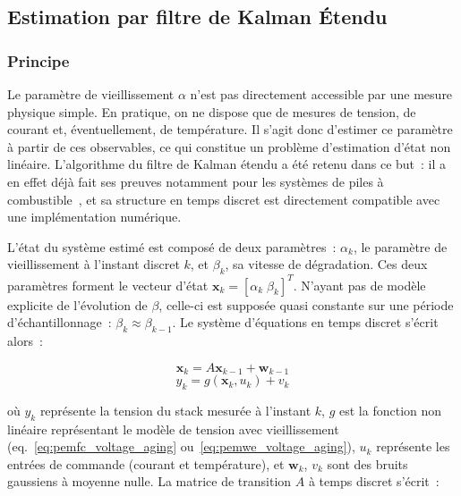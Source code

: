 \subsection{Estimation par filtre de Kalman Étendu}

\subsubsection{Principe}

Le paramètre de vieillissement $\alpha$ n'est pas directement accessible par une mesure physique simple. En pratique, on ne dispose que de mesures de tension, de courant et, éventuellement, de température. Il s'agit donc d'estimer ce paramètre à partir de ces observables, ce qui constitue un problème d'estimation d'état non linéaire. L'algorithme du filtre de Kalman étendu a été retenu dans ce but~: il a en effet déjà fait ses preuves notamment pour les systèmes de piles à combustible~\cite{bressel_extended_2016}\cite{chen_fuel_2019}, et sa structure en temps discret est directement compatible avec une implémentation numérique.

L'état du système estimé est composé de deux paramètres~: $\alpha_k$, le paramètre de vieillissement à l'instant discret $k$, et $\beta_k$, sa vitesse de dégradation. Ces deux paramètres forment le vecteur d'état $\mathbf{x}_k = [\alpha_k \; \beta_k]^T$. N'ayant pas de modèle explicite de l'évolution de $\beta$, celle-ci est supposée quasi constante sur une période d'échantillonnage~: $\beta_k \approx \beta_{k-1}$. Le système d'équations en temps discret s'écrit alors~:

\begin{equation}
    \mathbf{x}_k = A\mathbf{x}_{k-1} + \mathbf{w}_{k-1}
    \label{eq:ekf_state}
\end{equation}
\begin{equation}
    y_k = g(\mathbf{x}_k, u_k) + v_k
    \label{eq:ekf_output}
\end{equation}

où $y_k$ représente la tension du stack mesurée à l'instant $k$, $g$ est la fonction non linéaire représentant le modèle de tension avec vieillissement (eq.~\ref{eq:pemfc_voltage_aging} ou~\ref{eq:pemwe_voltage_aging}), $u_k$ représente les entrées de commande (courant et température), et $\mathbf{w}_k$, $v_k$ sont des bruits gaussiens à moyenne nulle. La matrice de transition $A$ à temps discret s'écrit~:

